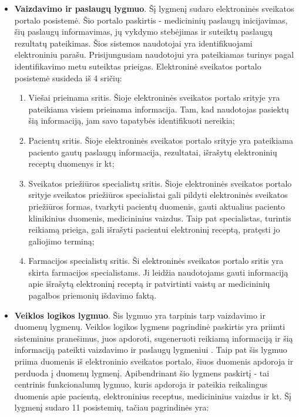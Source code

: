 \begin{itemize}
    \item \textbf{Vaizdavimo ir paslaugų lygmuo}. Šį lygmenį sudaro elektroninės sveikatos portalo posistemė. Šio portalo paskirtis - medicininių  paslaugų inicijavimas, šių paslaugų informavimas, jų vykdymo stebėjimas ir suteiktų paslaugų rezultatų pateikimas\cite{Specifikacija}. Šios sistemos naudotojai yra identifikuojami elektroniniu parašu. Prisijungusiam naudotojui yra pateikiamas turinys pagal identifikavimo metu suteiktas prieigas. Elektroninė sveikatos portalo posistemė susideda iš 4 sričių:
    \begin{enumerate}
        \item Viešai prieinama sritis. Šioje elektroninės sveikatos portalo srityje yra pateikiama visiem prieinama informacija. Tam, kad naudotojas pasiektų šią informaciją, jam savo tapatybės identifikuoti nereikia;
        \item Pacientų sritis. Šioje elektroninės sveikatos portalo srityje yra pateikiama paciento gautų paslaugų informacija, rezultatai, išrašytų elektroninių receptų duomenys ir kt;
        \item Sveikatos priežiūros specialistų sritis. Šioje elektroninės sveikatos portalo srityje sveikatos priežiūros specialistai gali pildyti elektroninės sveikatos priežiūros formas, tvarkyti pacientų duomenis, gauti aktualius paciento klinikinius duomenis, medicininius vaizdus. Taip pat specialistas, turintis reikiamą prieiga, gali išrašyti pacientui elektroninį receptą, pratęsti jo galiojimo terminą;
        \item Farmacijos specialistų sritis. Ši elektroninės sveikatos portalo sritis yra skirta farmacijos specialistams. Ji leidžia naudotojams  gauti informaciją apie išrašytą elektroninį receptą ir patvirtinti vaistų ar medicininių pagalbos priemonių išdavimo faktą.
    \end{enumerate}
    \item \textbf{Veiklos logikos lygmuo}. Šis lygmuo yra tarpinis tarp vaizdavimo ir duomenų lygmenų.  Veiklos logikos lygmens pagrindinė paskirtis yra priimti sisteminius pranešimus, juos apdoroti, sugeneruoti reikiamą informaciją ir šią informaciją pateikti vaizdavimo ir paslaugų lygmeniui \cite{Specifikacija}. Taip pat šis lygmuo priima duomenis iš elektroninio sveikatos portalo, šiuos duomenis apdoroja ir perduoda į duomenų lygmenį. Apibendrinant šio lygmens paskirtį - tai centrinis funkcionalumų lygmuo, kuris apdoroja ir pateikia reikalingus duomenis apie pacientą, elektroninius receptus, medicininius vaizdus ir kt. Šį lygmenį sudaro 11 posistemių, tačiau pagrindinės yra: 

\end{itemize}
